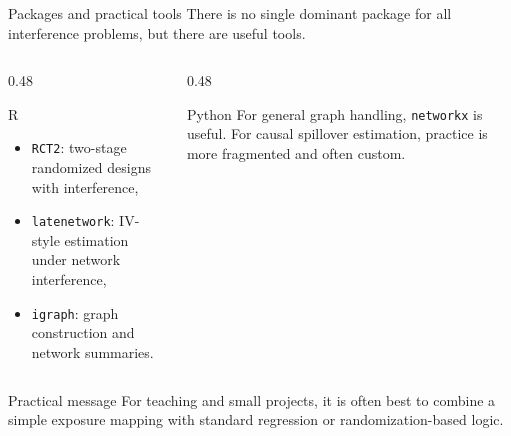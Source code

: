 \documentclass[dvipsnames,aspectratio=169,handout]{beamer}
\begin{document}
\begin{frame}{Packages and practical tools}
There is no single dominant package for all interference problems, but there are useful tools.

\begin{columns}[T]
\begin{column}{0.48\textwidth}
\begin{block}{R}
\begin{itemize}
    \item \texttt{RCT2}: two-stage randomized designs with interference,
    \item \texttt{latenetwork}: IV-style estimation under network interference,
    \item \texttt{igraph}: graph construction and network summaries.
\end{itemize}
\end{block}
\end{column}
\begin{column}{0.48\textwidth}
\begin{block}{Python}
For general graph handling, \texttt{networkx} is useful.
For causal spillover estimation, practice is more fragmented and often custom.
\end{block}
\end{column}
\end{columns}

\begin{alertblock}{Practical message}
For teaching and small projects, it is often best to combine a simple exposure mapping with standard regression or randomization-based logic.
\end{alertblock}
\end{frame}
\end{document}
